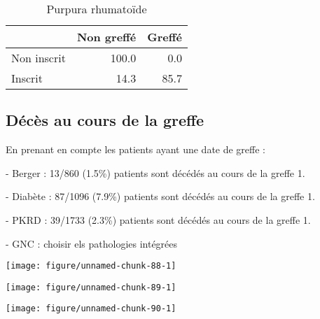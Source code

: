 \documentclass[11pt,a4paper]{article}\usepackage[]{graphicx}\usepackage[]{color}
\makeatletter
\def\maxwidth{ %
  \ifdim\Gin@nat@width>\linewidth
    \linewidth
  \else
    \Gin@nat@width
  \fi
}
\newenvironment{knitrout}{}{} %
\makeatother
\begin{document}
\begin{table}[H]
\centering
\begin{tabular}{lrr}
  \hline
 & Non greffé & Greffé \\ 
  \hline
Non inscrit & 100.0 & 0.0 \\ 
  Inscrit & 14.3 & 85.7 \\ 
   \hline
\end{tabular}
\caption{Purpura rhumatoïde} 
\end{table}



  \subsection{Décès au cours de la greffe}

En prenant en compte les patients ayant une date de greffe :

- Berger : 13/860 (1.5\%) patients sont décédés au cours de la greffe 1.

- Diabète : 87/1096 (7.9\%) patients sont décédés au cours de la greffe 1.

- PKRD : 39/1733 (2.3\%) patients sont décédés au cours de la greffe 1.

- GNC : choisir els pathologies intégrées

\begin{knitrout}
\color{fgcolor}
\texttt{[image: figure/unnamed-chunk-88-1]} 

\end{knitrout}


\begin{knitrout}
\color{fgcolor}
\texttt{[image: figure/unnamed-chunk-89-1]} 

\end{knitrout}


\begin{knitrout}
\color{fgcolor}
\texttt{[image: figure/unnamed-chunk-90-1]} 

\end{knitrout}
\end{document}
